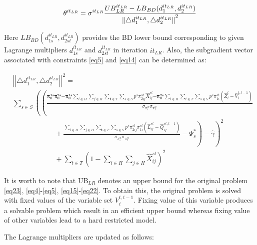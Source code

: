 \documentclass[review]{elsarticle}
\begin{document}
\begin{equation}\label{eq52}
{\theta }^{{it}_{LR}}={\sigma }^{{it}_{LR}}\frac{{UB}^{{it}_{LR}}_{LR}-{LB}_{BD}{\rm (}d^{it_{LR}}_1,d^{{it}_{LR}}_2{\rm )}}{{\|{\triangle d}^{it_{LR}}_1,{\triangle d}^{it_{LR}}_2\|}^2}
\end{equation}

Here ${LB}_{BD}(d^{{it}_{LR}}_{1s},d^{{it}_{LR}}_{2st})$ provides the BD lower bound corresponding to given Lagrange multipliers $d^{{it}_{LR}}_{1s}$ and $d^{{it}_{LR}}_{2st}$ in iteration ${it}_{LR}$. Also, the subgradient vector associated with constraints \eqref{eq5} and \eqref{eq14} can be determined as:

{\small
\begin{align}\label{eq53}
&{\left|\left|{\triangle d}^{it_{LR}}_1,{\triangle d}^{it_{LR}}_2\right|\right|}^2=\\ 
&\sum_{s\in S}\left(\left(\frac{{\mathbf{ \pi }}^{\mathbf{ 1}\mathbf{ s}}_{\mathbf{ 0}}{\mathbf{ \pi }}^{\mathbf{ 2}\mathbf{ s}}_{\mathbf{ 0}}\mathbf{ -}{\mathbf{ \pi }}^{\mathbf{ 1}\mathbf{ s}}_{\mathbf{ 0}}\sum_{i\in H}{\sum_{j\in H}{\sum_{\mathbf{ t}\in T}{\sum_{s\in S}{p^s{\pi }^{st}_{2ij}{\hat{X}}^{st}_{ij}}}}}\mathbf{ -}{\mathbf{ \pi }}^{\mathbf{ 2}\mathbf{ s}}_{\mathbf{ 0}}\sum_{i\in H}{\sum_{t\in T}{\sum_{s\in S}{p^s{\pi }^{st}_{1i}\left({\hat{Z}}^t_i-{\hat{V}}^{t,t-1}_i\right)}}}}{{\sigma }_{{\pi }^{st}_{1}}{\sigma }_{{\pi }^{st}_{2}}}\right.\right.\nonumber\\
&\qquad\qquad\qquad  +\left.\left.\frac{\sum_{i\in H}{\sum_{j\in H}{\sum_{\mathbf{ t}\in T}{\sum_{s\in S}{p^s{\pi }^{st}_{2ij}{\pi }^{st}_{1i}\left({\hat{L}}^{st}_{ij}-{\hat{Q}}^{st,t-1}_{ij}\right)}}}}}{{\sigma }_{{\pi }^{st}_{1}}{\sigma }_{{\pi }^{st}_{2}}}-{\Psi }^*_s\right)-\widehat{\gamma }\right)^2 \nonumber \\
&\qquad\qquad\qquad +\sum_{t\in T}\left(1-\sum_{i\in H}{\sum_{j\in H}{{\hat{X}}^{st}_{ij}}}\right)^2\nonumber 
\end{align}
}

It is worth to note that UB${}_{LR}$ denotes an upper bound for the original problem \eqref{eq23}, \eqref{eq4}-\eqref{eq5}, \eqref{eq15}-\eqref{eq22}. To obtain this, the original problem is solved with fixed values of the variable set $V^{t,t-1}_i$. Fixing value of this variable produces a solvable problem which result in an efficient upper bound whereas fixing value of other variables lead to a hard restricted model.

The Lagrange multipliers are updated as follows:
\end{document}
